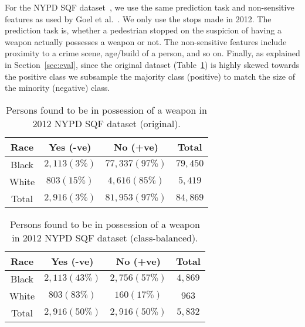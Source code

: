 \documentclass{article}
\begin{document}
\begin{appendix}
For the NYPD SQF dataset~\cite{sqf_dataset}, we use the same prediction task and non-sensitive features as used by Goel et al.~\cite{goel_frisk}. We only use the stops made in 2012.
The prediction task is, whether a pedestrian stopped on the suspicion of having a weapon actually possesses a weapon or not.
The non-sensitive features include proximity to a crime scene, age/build of a person, and so on.
Finally, as explained in Section~\ref{sec:eval}, since the original dataset (Table~\ref{table:sqf-stats-imba}) is highly skewed towards the positive class
we subsample the majority class (positive) to match the size of the minority (negative) class.




\begin{table}[h]
\centering
\caption{Persons found to be in possession of a weapon in 2012 NYPD SQF dataset (original).} \label{table:sqf-stats-imba}
\begin{tabular}{cccc}
\hline
Race  & Yes (-ve) & No (+ve) & Total \\ \hline
Black &  $ 2,113 (3\%) $ &  $ 77,337 (97\%) $  &  $ 79,450 $\\
White &  $ 803 (15\%) $ & $ 4,616 (85\%)$  &  $ 5,419 $\\ \hline
Total &  $ 2,916 (3\%)$ &  $  81,953 (97\%)$  &  $84,869$ \\ \hline
\end{tabular}
\end{table}


\begin{table}[!h]
\centering
\caption{Persons found to be in possession of a weapon in 2012 NYPD SQF dataset (class-balanced).} \label{table:sqf-stats}
\begin{tabular}{cccc}
\hline
Race  & Yes (-ve) & No (+ve) & Total \\ \hline
Black &  $ 2,113 (43\%) $ &  $ 2,756 (57\%) $  &  $ 4,869$\\
White &  $ 803 (83\%) $ & $ 160 (17\%) $  &  $963 $\\ \hline
Total &  $ 2,916 (50\%)$ &  $ 2,916 (50\%) $  &  $5,832$ \\ \hline
\end{tabular}
\end{table}








\makeatletter
\setlength{\@fptop}{0pt}
\makeatother

\end{appendix}
\end{document}
